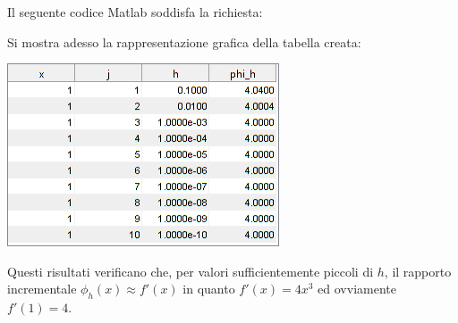 \begin{center}
\footnotesize\noindent{}\end{center}

\noindent Il seguente codice Matlab soddisfa la richiesta:


\noindent Si mostra adesso la rappresentazione grafica della tabella creata:
\begin{center}
	\includegraphics[scale=1]{cap1/es3.png}
\end{center}

\noindent Questi risultati verificano che, per valori sufficientemente piccoli di \(h\), il rapporto incrementale \(\phi_h(x) \approx f'(x)\) in quanto \(f'(x) = 4x^3\) ed ovviamente \(f'(1) = 4\).
